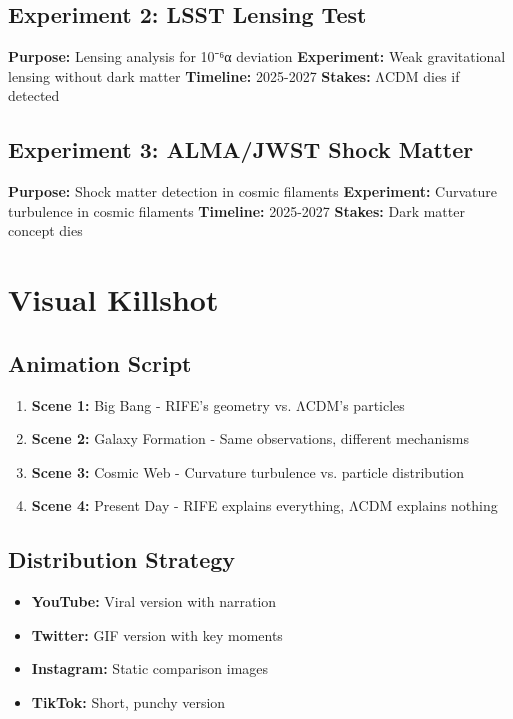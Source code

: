 \documentclass[11pt]{report}
\begin{document}
\subsection{Experiment 2: LSST Lensing Test}
\textbf{Purpose:} Lensing analysis for 10⁻⁶α deviation
\textbf{Experiment:} Weak gravitational lensing without dark matter
\textbf{Timeline:} 2025-2027
\textbf{Stakes:} ΛCDM dies if detected

\subsection{Experiment 3: ALMA/JWST Shock Matter}
\textbf{Purpose:} Shock matter detection in cosmic filaments
\textbf{Experiment:} Curvature turbulence in cosmic filaments
\textbf{Timeline:} 2025-2027
\textbf{Stakes:} Dark matter concept dies

\section{Visual Killshot}

\subsection{Animation Script}
\begin{enumerate}
\item \textbf{Scene 1:} Big Bang - RIFE's geometry vs. ΛCDM's particles
\item \textbf{Scene 2:} Galaxy Formation - Same observations, different mechanisms
\item \textbf{Scene 3:} Cosmic Web - Curvature turbulence vs. particle distribution
\item \textbf{Scene 4:} Present Day - RIFE explains everything, ΛCDM explains nothing
\end{enumerate}

\subsection{Distribution Strategy}
\begin{itemize}
\item \textbf{YouTube:} Viral version with narration
\item \textbf{Twitter:} GIF version with key moments
\item \textbf{Instagram:} Static comparison images
\item \textbf{TikTok:} Short, punchy version
\end{itemize}
\end{document}
